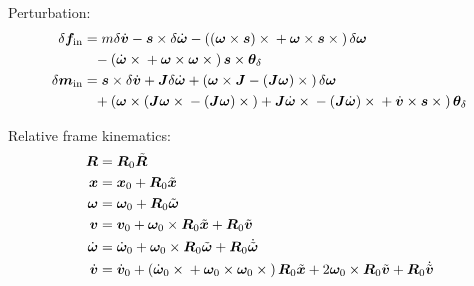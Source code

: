 \documentclass[10pt,dvips,fleqn,subeqn]{report}
\newcommand{\T}[1]{\bm{#1}}
\newcommand{\TT}[1]{\bm{#1}}
\begin{document}
Perturbation:
\begin{subequations}
\begin{align}
	\delta \T{f}_{\text{in}}
	&=
	m \delta \dot{\T{v}}
	- \T{s} \times \delta \dot{\T{\omega}}
	- \plbr{
		\plbr{\T{\omega} \times \T{s}} \times {}
		+ \T{\omega} \times \T{s} \times{}
	} \delta\T{\omega}
	\nonumber \\ &\hphantom{=}
	- \plbr{
		\dot{\T{\omega}} \times{}
		+ \T{\omega} \times \T{\omega} \times{}
	} \T{s} \times \T{\theta}_{\delta} \\
%
	\delta\T{m}_{\text{in}} &=
	\T{s} \times \delta\dot{\T{v}}
	+ \TT{J} \delta\dot{\T{\omega}}
	+ \plbr{
		\T{\omega} \times \TT{J}
		- \plbr{\TT{J} \T{\omega}} \times{}
	} \delta\T{\omega}
	\nonumber \\ &\hphantom{=}
	+ \plbr{
		\T{\omega} \times \plbr{
			\TT{J} \T{\omega} \times {}
			- \plbr{\TT{J} \T{\omega}} \times{}
		}
		+ \TT{J} \dot{\T{\omega}} \times{}
		- \plbr{\TT{J} \dot{\T{\omega}}} \times {}
		+ \dot{\T{v}} \times \T{s} \times {}
	} \T{\theta}_{\delta}
\end{align}
\end{subequations}

Relative frame kinematics:
\begin{subequations}
\begin{align}
	\TT{R} &= \TT{R}_0 \tilde{\TT{R}} \\
	\T{x} &= \T{x}_0
		+ \TT{R}_0 \tilde{\T{x}} \\
	\T{\omega} &= \T{\omega}_0
		+ \TT{R}_0 \tilde{\T{\omega}} \\
	\T{v} &= \T{v}_0
		+ \T{\omega}_0 \times \TT{R}_0 \tilde{\T{x}}
		+ \TT{R}_0 \tilde{\T{v}} \\
	\dot{\T{\omega}} &= \dot{\T{\omega}}_0
		+ \T{\omega}_0 \times \TT{R}_0 \tilde{\T{\omega}} 
		+ \TT{R}_0 \dot{\tilde{\T{\omega}}} \\
	\dot{\T{v}} &= \dot{\T{v}}_0
		+ \plbr{
			\dot{\T{\omega}}_0 \times{}
			+ \T{\omega}_0 \times \T{\omega}_0 \times{}
		} \TT{R}_0 \tilde{\T{x}}
		+ 2 \T{\omega}_0 \times \TT{R}_0 \tilde{\T{v}}
		+ \TT{R}_0 \dot{\tilde{\T{v}}}
\end{align}
\end{subequations}
\end{document}
